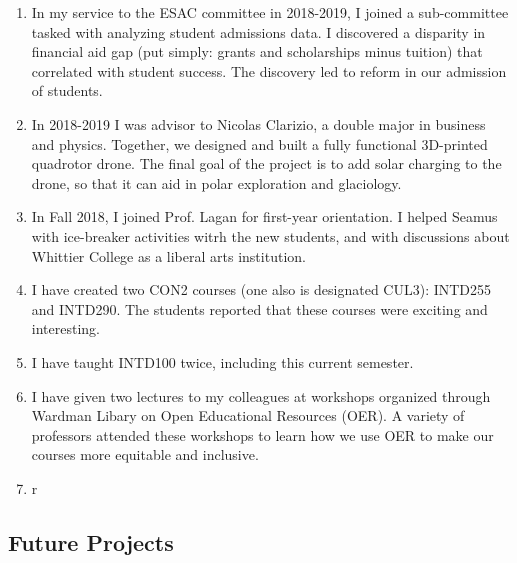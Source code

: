 \documentclass[../../../main.tex]{subfiles}
\begin{document}
\begin{enumerate}
\item In my service to the ESAC committee in 2018-2019, I joined a sub-committee tasked with analyzing student admissions data.  I discovered a disparity in financial aid gap (put simply: grants and scholarships minus tuition) that correlated with student success.  The discovery led to reform in our admission of students.
\item In 2018-2019 I was advisor to Nicolas Clarizio, a double major in business and physics.  Together, we designed and built a fully functional 3D-printed quadrotor drone.  The final goal of the project is to add solar charging to the drone, so that it can aid in polar exploration and glaciology.
\item In Fall 2018, I joined Prof. Lagan for first-year orientation. I helped Seamus with ice-breaker activities witrh the new students, and with discussions about Whittier College as a liberal arts institution.
\item I have created two CON2 courses (one also is designated CUL3): INTD255 and INTD290.  The students reported that these courses were exciting and interesting.
\item I have taught INTD100 twice, including this current semester.
\item I have given two lectures to my colleagues at workshops organized through Wardman Libary on Open Educational Resources (OER).  A variety of professors attended these workshops to learn how we use OER to make our courses more equitable and inclusive.
\item r
\end{enumerate}
\subsection{Future Projects}
\end{document}
